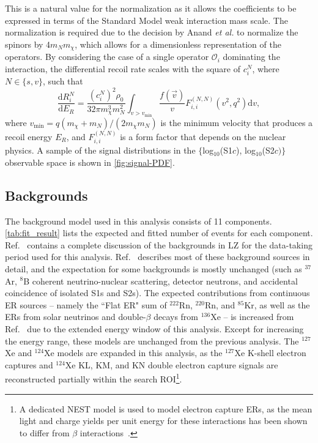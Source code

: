 \documentclass[reprint, showpacs,
preprintnumbers,
amsmath,amssymb,
aps, floatfix,
superscriptaddress,
prd, nofootinbib]{revtex4-1}
\begin{document}
This is a natural value for the normalization as it allows the coefficients to be expressed in terms of the Standard Model weak interaction mass scale.
The normalization is required due to the decision by Anand \textit{et al.} to normalize the spinors by 4$m_N m_\chi$, which allows for a dimensionless representation of the operators. 
By considering the case of a single operator $\mathcal{O}_i$ dominating the interaction, the differential recoil rate scales with the square of $c_i^N$, where $N \in \{s, v\}$, such that
\begin{equation}\label{eq:spectrumReduced}
     \frac{\mathrm{d} R_i^N}{\mathrm{d} E_{R}}=\frac{(c_{i}^{N})^2 \rho_{0}}{32 \pi m_{\chi}^{3} m_{N}^{2}} \int_{v>v_\text{min}} \frac{f(\vec{v})}{v} F_{i, i}^{\left(N, N\right)}\left(v^2, q^{2}\right) \mathrm{d}{v},
\end{equation}
where $v_\text{min} = q(m_\chi + m_N) / (2 m_\chi m_N)$ is the minimum velocity that produces a recoil energy $E_R$, and $F_{i,i}^{(N, N)}$ is a form factor that depends on the nuclear physics. 
A sample of the signal distributions in the $\{$log$_{10}$(S1$c$), log$_{10}$(S2$c)\}$ observable space is shown in \autoref{fig:signal-PDF}.

\subsection{\label{subsec:bg}Backgrounds}
\par
The background model used in this analysis consists of 11 components.
\autoref{tab:fit_result} lists the expected and fitted number of events for each component.
Ref.~\cite{LZ:sr1backgrounds_2022} contains a complete discussion of the backgrounds in LZ for the data-taking period used for this analysis.
Ref.~\cite{LZ:SR1WS_2022} describes most of these background sources in detail, and the expectation for some backgrounds is mostly unchanged (such as ${}^{37}$Ar, ${}^{8}$B coherent neutrino-nuclear scattering, detector neutrons, and accidental coincidence of isolated S1s and S2s). 
The expected contributions from continuous ER sources -- namely the ``Flat ER" sum of ${}^{222}$Rn, ${}^{220}$Rn, and ${}^{85}$Kr, as well as the ERs from solar neutrinos and double-$\beta$ decays from ${}^{136}$Xe -- is increased from Ref.~\cite{LZ:SR1WS_2022} due to the extended energy window of this analysis. 
Except for increasing the energy range, these models are unchanged from the previous analysis. 
The ${}^{127}$Xe and ${}^{124}$Xe models are expanded in this analysis, as the ${}^{127}$Xe K-shell electron captures and ${}^{124}$Xe KL, KM, and KN double electron capture signals are reconstructed partially within the search ROI\footnote{A dedicated NEST model is used to model electron capture ERs, as the mean light and charge yields per unit energy for these interactions has been shown to differ from $\beta$ interactions~\cite{XELDA_Lshell_EC}.}.
\end{document}
